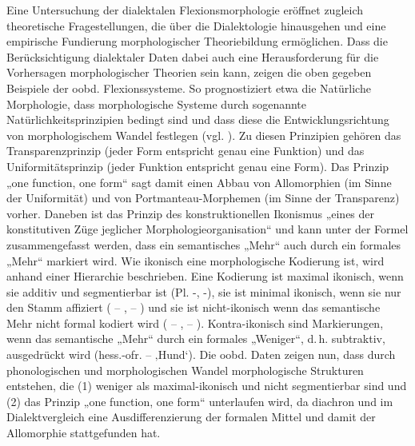 \begin{sloppypar}
Eine Untersuchung der dialektalen Flexionsmorphologie eröffnet zugleich the\-o\-re\-ti\-sche Fragestellungen, die über die Dialektologie hinausgehen und eine empirische Fundierung morphologischer Theoriebildung ermöglichen. Dass die Berücksichtigung dialektaler Daten dabei auch eine Herausforderung für die Vorhersagen morphologischer Theorien sein kann, zeigen die oben gegeben Beispiele der oobd. Flexionssysteme. So prognostiziert etwa die Natürliche Morphologie, dass morphologische Systeme durch sogenannte Natürlichkeitsprinzipien bedingt sind und dass diese die Entwicklungsrichtung von morphologischem Wandel festlegen (vgl. \citealt{Mayerthaler1981, Wurzel1984}). Zu diesen Prinzipien gehören das Transparenzprinzip (jeder Form entspricht genau eine Funktion) und das Uniformitätsprinzip (jeder Funktion entspricht genau eine Form). Das Prinzip „one function, one form“ sagt damit einen Abbau von Allomorphien (im Sinne der Uniformität) und von Portmanteau-Morphemen (im Sinne der Transparenz) vorher. Daneben ist das Prinzip des konstruktionellen Ikonismus „eines der konstitutiven Züge jeglicher Morphologieorganisation“ \citep[23]{Mayerthaler1981} und kann unter der Formel zusammengefasst werden, dass ein semantisches „Mehr“ auch durch ein formales „Mehr“ markiert wird. Wie ikonisch eine morphologische Kodierung ist, wird anhand einer Hierarchie beschrieben. Eine Kodierung ist maximal ikonisch, wenn sie additiv und segmentierbar ist (Pl. -, -), sie ist minimal ikonisch, wenn sie nur den Stamm affiziert ( -- ,  -- ) und sie ist nicht-ikonisch wenn das semantische Mehr nicht formal kodiert wird ( -- ,  -- ). Kontra-ikonisch sind Markierungen, wenn das semantische „Mehr“ durch ein formales „Weniger“, d.\,h. subtraktiv, ausgedrückt wird (hess.-ofr.  --  ‚Hund‘). Die oobd. Daten zeigen nun, dass durch phonologischen und morphologischen Wandel morphologische Strukturen entstehen, die (1) weniger als maximal-ikonisch und nicht segmentierbar sind und (2) das Prinzip „one function, one form“ unterlaufen wird, da diachron und im Dialektvergleich eine Ausdifferenzierung der formalen Mittel und damit der Allomorphie stattgefunden hat.
\end{sloppypar}

